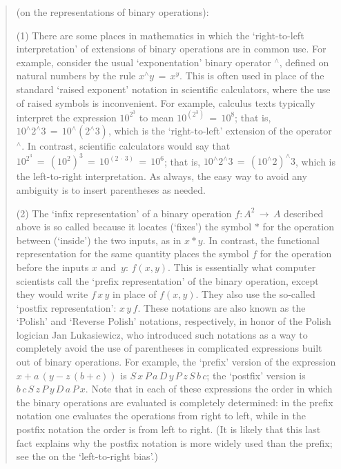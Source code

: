 \begin{quotation}
{\footnotesize \underline{\Notes} (on the representations of binary operations):

\V

        (1) There are some places in mathematics in which the `right-to-left interpretation' of extensions of binary operations are in common use.
        For example, consider the usual `exponentation' binary operator $^{{\wedge}}$,
    defined on natural numbers by the rule $x^{{\wedge}}y \,=\, x^{y}$. This is often used in place of
    the standard `raised exponent' notation in scientific calculators, where the use of raised symbols is inconvenient.
    For example, calculus texts typically interpret the expression $10^{2^{3}}$ to mean $10^{(2^3)} \,=\, 10^{8}$;
    that is, $10^{{\wedge}}2^{{\wedge}}3 \,=\, 10^{{\wedge}}(2^{{\wedge}}3)$, which is the `right-to-left' extension of the operator~$^{{\wedge}}$.
    In contrast, scientific calculators would say that $10^{2^{3}} \,=\, (10^{2})^{3} \,=\, 10^{(2\,{\cdot}\,3)} \,=\, 10^{6}$;
    that is, $10^{{\wedge}}2^{{\wedge}}3 \,=\, (10^{{\wedge}}2)^{{\wedge}}3$, which is the left-to-right interpretation.
    As always, the easy way to avoid any ambiguity is to insert parentheses as needed.


        (2) The `infix representation' of a binary operation $f:A^{2} \,{\rightarrow}\, A$ described above is so called
    because it locates (`fixes') the symbol ${\ast}$ for the operation between (`inside') the two inputs, as in $x{\ast}y$.
    In contrast, the functional representation for the same quantity places the symbol $f$ for the operation before the inputs $x$ and~$y$: $f(x,y)$.
    This is essentially what computer scientists call the `prefix representation' of the binary operation,
    except they would write $f\,x\,y$ in place of $f(x,y)$. They also use the so-called `postfix representation': $x\,y\,f$.
    These notations are also known as the `Polish' and `Reverse Polish' notations, respectively, in honor of the Polish logician Jan Lukasiewicz,
    who introduced such notations as a way to completely avoid the use of parentheses in complicated expressions built out of binary operations.
    For example, the `prefix' version of the expression $x + a\,(y - z\,(b+c))$ is $S\,x\,P\,a\,D\,y\,P\,z\,S\,b\,c$;
    the `postfix' version is $b\,c\,S\,z\,P\,y\,D\,a\,P\,x$.
    Note that in each of these expressions the order in which the binary operations are evaluated is completely determined:
    in the prefix notation one evaluates the operations from right to left, while in the postfix notation the order is from left to right.
    (It is likely that this last fact explains why the postfix notation is more widely used than the prefix; see the {\Note} on the `left-to-right bias'.)
}%
\end{quotation}


